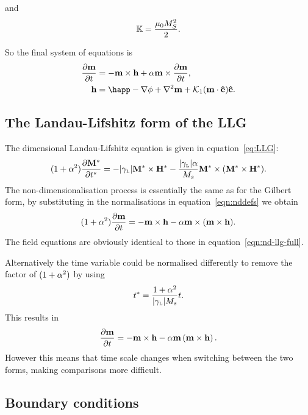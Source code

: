 and
\begin{equation}
  \label{k-normalisation}
  \mathbb{K} = \frac{ \mu_0 M_S^2}{2}.
\end{equation}

So the final system of equations is
\begin{equation}
  \begin{aligned}
    \dmdt &= - \mv \times \hv + \alpha \mv \times \dmdt, \\
    \hv &= \happ - \nabla \phi + \lap \mv + \kone (\mv \cdot \ev) \ev.
    \label{eqn:nd-llg-full}
  \end{aligned}
\end{equation}

\subsection{The Landau-Lifshitz form of the LLG}
\label{sec:land-lifsh-normalisation}

The dimensional Landau-Lifshitz equation is given in equation~\eqref{eq:LLG}:
\begin{equation}
  \label{eq:LLG-dim}
  (1 + \alpha^2) \frac{\partial \mathbf{M}^*}{\partial t^*} = - {\left|{\gamma_{\text{\tiny{L}}}} \right|} \mathbf{M}^* \times \mathbf{H}^*
  - \frac{{\left|{\gamma_{\text{\tiny{L}}}} \right|} \alpha}{M_s} \mathbf{M}^* \times (\mathbf{M}^* \times \mathbf{H}^*).
\end{equation}
The non-dimensionalisation process is essentially the same as for the Gilbert form, by substituting in the normalisations in equation~\eqref{eqn:nddefs} we obtain
\begin{equation}
  (1 + \alpha^2) \frac{\partial \mathbf{m}}{\partial t} = - \mathbf{m} \times \mathbf{h} - \alpha \mathbf{m} \times (\mathbf{m} \times \mathbf{h}).
\end{equation}
The field equations are obviously identical to those in equation~\eqref{eqn:nd-llg-full}.


Alternatively the time variable could be normalised differently to remove the factor of $(1 + \alpha^2)$ by using
\begin{equation}
  t^* = \frac{1 + \alpha^2}{{\left|{\gamma_{\text{\tiny{L}}}} \right|} M_s} t.
\end{equation}
This results in
\begin{equation}
  \frac{\partial \mathbf{m}}{\partial t} = -\mathbf{m} \times \mathbf{h} -\alpha \mathbf{m} \left(\mathbf{m} \times \mathbf{h} \right).
\end{equation}
However this means that time scale changes when switching between the two forms, making comparisons more difficult.

\subsection{Boundary conditions}
\label{sec:non-dim-boundary-conditions}

